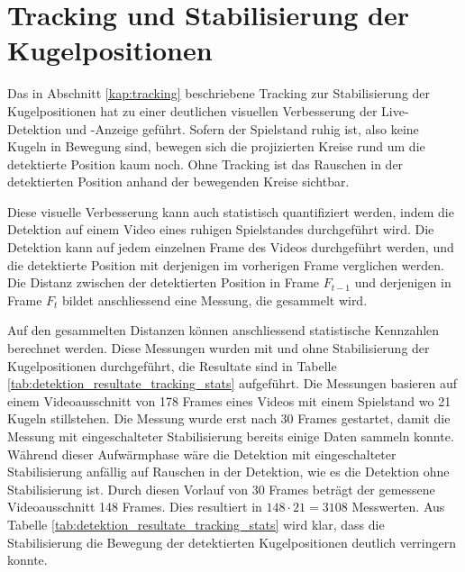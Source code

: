 \section{Tracking und Stabilisierung der Kugelpositionen}
Das in Abschnitt \ref{kap:tracking} beschriebene Tracking zur Stabilisierung der Kugelpositionen hat zu einer deutlichen
visuellen Verbesserung der Live-Detektion und -Anzeige geführt.
Sofern der Spielstand ruhig ist, also keine Kugeln in Bewegung sind, bewegen sich die
projizierten Kreise rund um die detektierte Position kaum noch.
Ohne Tracking ist das Rauschen in der detektierten Position anhand der bewegenden Kreise sichtbar.

Diese visuelle Verbesserung kann auch statistisch quantifiziert werden, indem die Detektion auf einem Video eines
ruhigen Spielstandes durchgeführt wird. Die Detektion kann auf jedem einzelnen Frame des Videos durchgeführt werden, und
die detektierte Position mit derjenigen im vorherigen Frame verglichen werden.
Die Distanz zwischen der detektierten Position in Frame $F_{t-1}$ und derjenigen in Frame $F_{t}$ bildet anschliessend
eine Messung, die gesammelt wird.

Auf den gesammelten Distanzen können anschliessend statistische Kennzahlen berechnet werden.
Diese Messungen wurden mit und ohne Stabilisierung der Kugelpositionen durchgeführt, die Resultate sind in Tabelle \ref{tab:detektion_resultate_tracking_stats} aufgeführt.
Die Messungen basieren auf einem Videoausschnitt von 178 Frames eines Videos mit einem Spielstand wo 21 Kugeln stillstehen.
Die Messung wurde erst nach 30 Frames gestartet, damit die Messung mit eingeschalteter Stabilisierung bereits einige
Daten sammeln konnte.
Während dieser Aufwärmphase wäre die Detektion mit eingeschalteter Stabilisierung anfällig auf Rauschen in der Detektion,
wie es die Detektion ohne Stabilisierung ist.
Durch diesen Vorlauf von 30 Frames beträgt der gemessene Videoausschnitt 148 Frames.
Dies resultiert in $148 \cdot 21 = 3108$ Messwerten.
Aus Tabelle \ref{tab:detektion_resultate_tracking_stats} wird klar, dass die Stabilisierung die Bewegung der
detektierten Kugelpositionen deutlich verringern konnte.

